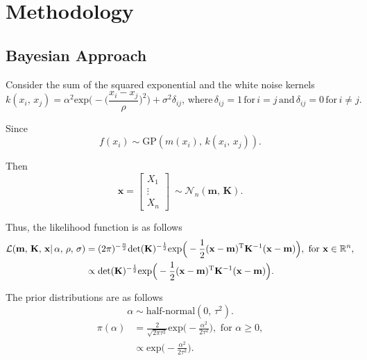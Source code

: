 \section{Methodology}
   \subsection{Bayesian Approach}

      Consider the sum of the squared exponential and the white noise kernels
      \[k(x_{i}, \, x_{j}) = \alpha^{2} \text{exp} \bigg(- \Big(\frac{x_i - x_j}{\rho} \Big)^2 \bigg) + 
      \sigma^2\delta_{ij}, \, \text{where} \, \delta_{ij} = 1 \, \text{for} \, i = j \, \text{and} \, \delta_{ij} = 0 \, \text{for} \, i \neq j.\]

      Since
      \[f(x_{i}) \sim \text{GP}(m(x_{i}) ,\, k(x_{i},\, x_{j})).\]

      Then
      \[\mathbf{x} =
      \begin{bmatrix}
         X_{1} \\
         \vdots \\
         X_{n}
      \end{bmatrix}
      \:
      \sim \mathcal{N}_{n}(\mathbf{m}, \, \mathbf{K}).\]

      Thus, the likelihood function is as follows
      \begin{align*}
         \mathcal{L}(\mathbf{m} ,\, \mathbf{K} ,\, \mathbf{x}| \, \alpha ,\, \rho ,\, \sigma)
         & = (2\pi)^{-\frac{n}{2}}\text{det} (\mathbf{K})^{-\frac{1}{2}} 
         \text{exp} \Big(-\frac{1}{2} (\mathbf{x} - \mathbf{m})^{\text{\text{T}}} \mathbf{K}^{-1} (\mathbf{x} - \mathbf{m}) \Big),
         \text{ for } \mathbf{x} \in \mathbb{R}^{n},\\
         & \propto \text{det}(\mathbf{K})^{-\frac{1}{2}} 
         \text{exp} \Big(-\frac{1}{2} (\mathbf{x} - \mathbf{m})^{\text{\text{T}}} \mathbf{K}^{-1} (\mathbf{x} - \mathbf{m}) \Big).
      \end{align*}

      The prior distributions are as follows
      \[\alpha \sim \text{half-normal} (0, \, \tau^2).\]
      \begin{align*}
         \pi(\alpha) 
         & = \frac{2}{\sqrt{2\pi\tau^2}} \text{exp} \Big(-\frac{\alpha^2}{2\tau^2} \Big), \text{ for } \alpha \geq 0,\\
         & \propto \text{exp} \Big(-\frac{\alpha^2}{2\tau^2} \Big).
      \end{align*}

